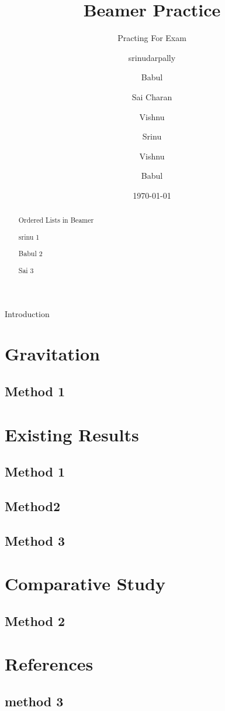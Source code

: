 \documentclass{beamer}
\title{Beamer Practice}
\subtitle{Practing For Exam}
\author{srinudarpally}
\author{Babul \and
       Sai Charan \and
       Vishnu}
\author{Srinu \inst{Engineer} \and Vishnu \inst{Mechanical} \and Babul \inst{Programmer}}
\date{\today}
\begin{document}

\begin{frame}
    \titlepage
\end{frame}

\begin{frame}{Introduction}
    \tableofcontents
\end{frame}

\section{Gravitation}
\subsection{Method 1}
\section{Existing Results}
    \subsection{Method 1}
    \subsection{Method2}
    \subsection{Method 3}
\section{Comparative Study}
    \subsection{Method 2}
\section*{References}
    \subsection{method 3}



\begin{abstract}
\begin{frame}{Ordered Lists in Beamer}
\begin{itemmize}
    \item srinu 1
    \item Babul 2
    \item Sai 3
\end{itemmize}
    
\end{frame}
\end{abstract}
\end{document}
